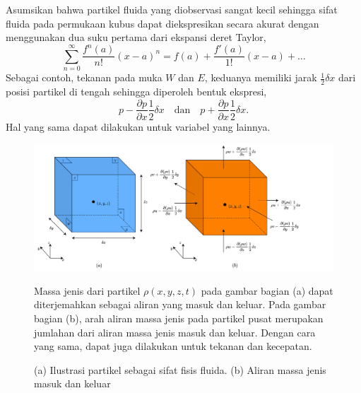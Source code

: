\begin{spacing}{1.5}
	Asumsikan bahwa partikel fluida yang diobservasi sangat kecil sehingga sifat fluida pada permukaan kubus dapat diekspresikan secara akurat dengan menggunakan dua suku pertama dari ekspansi deret Taylor, 
	\begin{equation*}
		\sum_{n=0}^{\infty}\frac{f^{n}(a)}{n!}(x-a)^n = f(a)+\frac{f'(a)}{1!}(x-a)+\dots
	\end{equation*} 
	Sebagai contoh, tekanan pada muka $W$ dan $E$, keduanya memiliki jarak $\frac{1}{2}\delta x$ dari posisi partikel di tengah sehingga diperoleh bentuk ekspresi,
	\begin{equation*}
		p-\frac{\partial p}{\partial x}\frac{1}{2}\delta x \quad \text{dan} \quad
		p+\frac{\partial p}{\partial x}\frac{1}{2}\delta x.
	\end{equation*}
	Hal yang sama dapat dilakukan untuk variabel yang lainnya.
	\begin{figure}[H]
		\centering
		\includegraphics[width=16cm]{contents/cube}
		\caption{(a) Ilustrasi partikel sebagai sifat fisis fluida. (b) Aliran massa jenis masuk dan keluar \protect{}}
		\label{fig:cube}
		\medspace
		\small
		Massa jenis dari partikel $\rho(x,y,z,t)$ pada gambar bagian (a) dapat diterjemahkan sebagai aliran yang masuk dan keluar. Pada gambar bagian (b), arah aliran massa jenis pada partikel pusat merupakan jumlahan dari aliran massa jenis masuk dan keluar. Dengan cara yang sama, dapat juga dilakukan untuk tekanan dan kecepatan. 
	\end{figure}
	
\end{spacing}
\vspace{-1pc}
